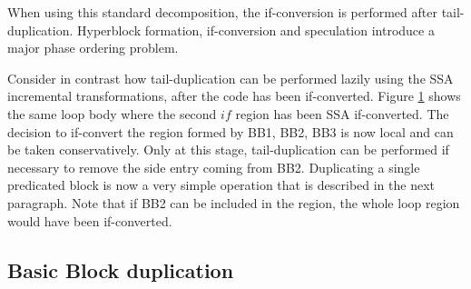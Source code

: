 \begin{figure}[h]
{    \label{fig:hyper4}}
\end{figure}

When using this standard decomposition, the if-conversion is performed after tail-duplication. Hyperblock formation, if-conversion and speculation introduce a major phase ordering problem. 

Consider in contrast how tail-duplication can be performed lazily using the SSA incremental transformations, after the code has been if-converted. Figure \ref{fig:hyper4} shows the same loop body where the second $if$ region has been SSA if-converted. The decision to if-convert the region formed by {BB1, BB2, BB3} is now local and can be taken conservatively. Only at this stage, tail-duplication can be performed if necessary to remove the side entry coming from BB2. Duplicating a single predicated block is now a very simple operation that is described in the next paragraph. Note that if BB2 can be included in the region, the whole loop region would have been if-converted.

\subsection{Basic Block duplication}

